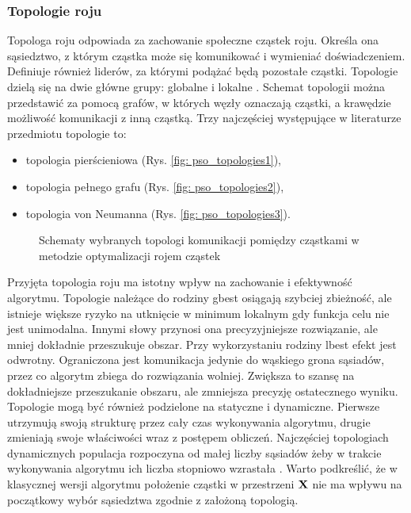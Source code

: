 \subsubsection{Topologie roju}
Topologa roju odpowiada za zachowanie społeczne cząstek roju.  Określa ona sąsiedztwo, z którym cząstka może się komunikować i wymieniać doświadczeniem. Definiuje również liderów, za którymi podążać będą pozostałe cząstki. Topologie dzielą się na dwie główne grupy: globalne  i lokalne . Schemat topologii można przedstawić za pomocą grafów, w których węzły oznaczają cząstki, a krawędzie możliwość komunikacji z inną cząstką. Trzy najczęściej występujące w literaturze przedmiotu topologie to:
\begin{itemize}[noitemsep]
	\item topologia pierścieniowa (Rys. \ref{fig: pso_topologies1}),
	\item topologia pełnego grafu (Rys. \ref{fig: pso_topologies2}),
	\item topologia von Neumanna (Rys. \ref{fig: pso_topologies3}).
\end{itemize}
\begin{figure}[h]
	\centering
	\captionsetup{justification=centering}
	\caption{Schematy wybranych topologi komunikacji pomiędzy cząstkami w metodzie optymalizacji rojem cząstek}
	\label{fig: pso_topologies}
\end{figure}
Przyjęta topologia roju ma istotny wpływ na zachowanie i efektywność algorytmu. Topologie należące do rodziny gbest osiągają szybciej zbieżność, ale istnieje większe ryzyko na utknięcie w minimum lokalnym gdy funkcja celu nie jest unimodalna. Innymi słowy przynosi ona precyzyjniejsze rozwiązanie, ale mniej dokładnie przeszukuje obszar. Przy wykorzystaniu rodziny lbest efekt jest odwrotny. Ograniczona jest komunikacja jedynie do wąskiego grona sąsiadów, przez co algorytm zbiega do rozwiązania wolniej. Zwiększa to szansę na dokładniejsze przeszukanie obszaru, ale zmniejsza precyzję ostatecznego wyniku. Topologie mogą być również podzielone na statyczne i dynamiczne. Pierwsze utrzymują swoją strukturę przez cały czas wykonywania algorytmu, drugie zmieniają swoje właściwości wraz z postępem obliczeń. Najczęściej topologiach dynamicznych populacja rozpoczyna od małej liczby sąsiadów żeby w trakcie wykonywania algorytmu ich liczba stopniowo wzrastała \parencite{Poli2007}. Warto podkreślić, że w klasycznej wersji algorytmu położenie cząstki w przestrzeni $\mathbf{X}$ nie ma wpływu na początkowy wybór sąsiedztwa zgodnie z założoną topologią.

